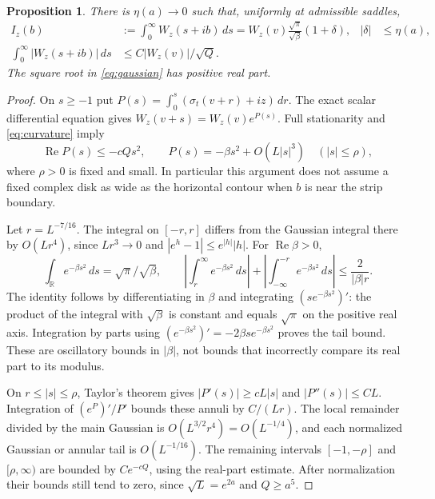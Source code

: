 \documentclass[11pt]{article}
\newtheorem{proposition}[theorem]{Proposition}
\begin{document}
\begin{proposition}\label{prop:gaussian}
There is $\eta(a)\to0$ such that, uniformly at admissible saddles,
\begin{align}
 I_z(b)&:=\int_0^\infty W_z(s+ib)\,ds
   =W_z(v)\frac{\sqrt\pi}{\sqrt\beta}(1+\delta),
       &|\delta|&\leq\eta(a),\label{eq:gaussian}\\
 \int_0^\infty |W_z(s+ib)|\,ds
   &\leq C|W_z(v)|/\sqrt Q.\label{eq:mass}
\end{align}
The square root in \eqref{eq:gaussian} has positive real part.
\end{proposition}
\begin{proof}
On $s\geq-1$ put
$P(s)=\int_0^s(\sigma_t(v+r)+iz)\,dr$.
The exact scalar differential equation gives
$W_z(v+s)=W_z(v)e^{P(s)}$. Full stationarity and
\eqref{eq:curvature} imply
\[
 \operatorname{Re}P(s)\leq-cQs^2,\qquad
 P(s)=-\beta s^2+O(L|s|^3)\quad(|s|\leq\rho),
\]
where $\rho>0$ is fixed and small. In particular this
argument does not assume a fixed complex disk as wide as
the horizontal contour when $b$ is near the strip boundary.

Let $r=L^{-7/16}$. The integral on $[-r,r]$ differs
from the Gaussian integral there by $O(Lr^4)$, since
$Lr^3\to0$ and $|e^h-1|\leq e^{|h|}|h|$.
For $\operatorname{Re}\beta>0$,
\[
 \int_{\mathbb R}e^{-\beta s^2}\,ds=\sqrt\pi/\sqrt\beta,
 \qquad
 \left|\int_r^\infty e^{-\beta s^2}\,ds\right|
 +\left|\int_{-\infty}^{-r}e^{-\beta s^2}\,ds\right|
 \leq\frac{2}{|\beta|r}.
\]
The identity follows by differentiating in $\beta$ and
integrating $(se^{-\beta s^2})'$: the product of the integral
with $\sqrt\beta$ is constant and equals $\sqrt\pi$ on the
positive real axis. Integration by parts using
$(e^{-\beta s^2})'=-2\beta s e^{-\beta s^2}$ proves the
tail bound. These are oscillatory bounds in $|\beta|$,
not bounds that incorrectly compare its real part to its modulus.

On $r\leq|s|\leq\rho$, Taylor's theorem gives
$|P'(s)|\geq cL|s|$ and $|P''(s)|\leq CL$.
Integration of $(e^P)'/P'$ bounds these annuli by
$C/(Lr)$. The local remainder divided by the main Gaussian
is $O(L^{3/2}r^4)=O(L^{-1/4})$, and each normalized
Gaussian or annular tail is $O(L^{-1/16})$.
The remaining intervals $[-1,-\rho]$ and $[\rho,\infty)$
are bounded by $Ce^{-cQ}$, using the real-part estimate.
After normalization their bounds still tend to zero, since
$\sqrt L=e^{2a}$ and $Q\geq a^5$.


\end{proof}
\end{document}

